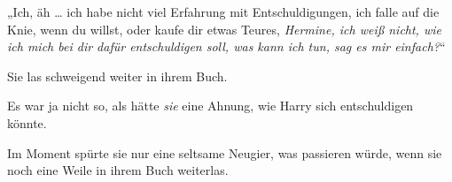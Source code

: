 „Ich, äh … ich habe nicht viel Erfahrung mit Entschuldigungen, ich falle auf die Knie, wenn du willst, oder kaufe dir etwas Teures, \emph{Hermine, ich weiß nicht, wie ich mich bei dir dafür entschuldigen soll, was kann ich tun, sag es mir einfach?}“

Sie las schweigend weiter in ihrem Buch.

Es war ja nicht so, als hätte \emph{sie} eine Ahnung, wie Harry sich entschuldigen könnte.

Im Moment spürte sie nur eine seltsame Neugier, was passieren würde, wenn sie noch eine Weile in ihrem Buch weiterlas.